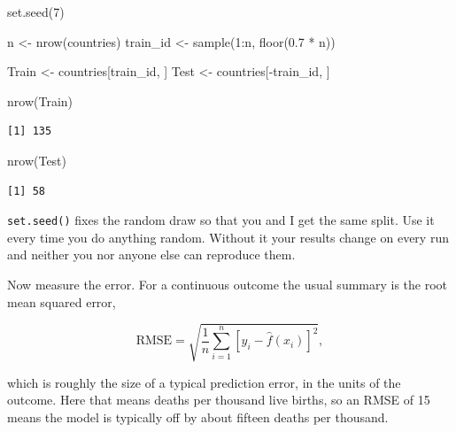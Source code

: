 \documentclass[
  a4paper,
]{scrbook}
\newenvironment{Shaded}{\begin{snugshade}}{\end{snugshade}}
\newcommand{\DecValTok}[1]{\textcolor[rgb]{0.68,0.00,0.00}{#1}}
\newcommand{\FloatTok}[1]{\textcolor[rgb]{0.68,0.00,0.00}{#1}}
\newcommand{\FunctionTok}[1]{\textcolor[rgb]{0.28,0.35,0.67}{#1}}
\newcommand{\NormalTok}[1]{\textcolor[rgb]{0.00,0.23,0.31}{#1}}
\newcommand{\OtherTok}[1]{\textcolor[rgb]{0.00,0.23,0.31}{#1}}
\newcommand{\SpecialCharTok}[1]{\textcolor[rgb]{0.37,0.37,0.37}{#1}}
\begin{document}
\begin{Shaded}
\begin{Highlighting}[]
\FunctionTok{set.seed}\NormalTok{(}\DecValTok{7}\NormalTok{)}

\NormalTok{n        }\OtherTok{\textless{}{-}} \FunctionTok{nrow}\NormalTok{(countries)}
\NormalTok{train\_id }\OtherTok{\textless{}{-}} \FunctionTok{sample}\NormalTok{(}\DecValTok{1}\SpecialCharTok{:}\NormalTok{n, }\FunctionTok{floor}\NormalTok{(}\FloatTok{0.7} \SpecialCharTok{*}\NormalTok{ n))}

\NormalTok{Train }\OtherTok{\textless{}{-}}\NormalTok{ countries[train\_id, ]}
\NormalTok{Test  }\OtherTok{\textless{}{-}}\NormalTok{ countries[}\SpecialCharTok{{-}}\NormalTok{train\_id, ]}

\FunctionTok{nrow}\NormalTok{(Train)}
\end{Highlighting}
\end{Shaded}

\begin{verbatim}
[1] 135
\end{verbatim}

\begin{Shaded}
\begin{Highlighting}[]
\FunctionTok{nrow}\NormalTok{(Test)}
\end{Highlighting}
\end{Shaded}

\begin{verbatim}
[1] 58
\end{verbatim}

\texttt{set.seed()} fixes the random draw so that you and I get the same
split. Use it every time you do anything random. Without it your results
change on every run and neither you nor anyone else can reproduce them.

Now measure the error. For a continuous outcome the usual summary is the
root mean squared error,

\[\text{RMSE} = \sqrt{\frac{1}{n}\sum_{i=1}^{n}\left[y_i - \hat{f}(x_i)\right]^2},\]

which is roughly the size of a typical prediction error, in the units of
the outcome. Here that means deaths per thousand live births, so an RMSE
of 15 means the model is typically off by about fifteen deaths per
thousand.
\end{document}
